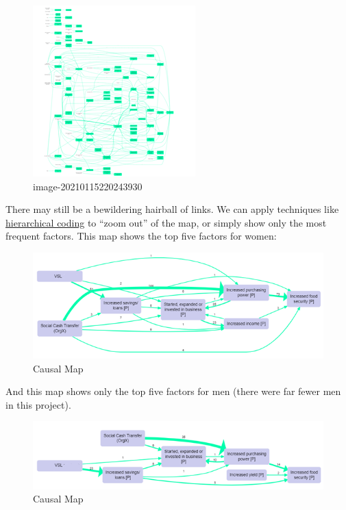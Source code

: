 \documentclass[
]{book}
\begin{document}
\begin{figure}
\centering
\includegraphics{_assets/image-20210115220243930.png}
\caption{image-20210115220243930}
\end{figure}

There may still be a bewildering hairball of links. We can apply techniques like \href{https://causalmapdocumentation.blot.im/simplifying-causal-maps-with-hierarchical-coding}{hierarchical coding} to ``zoom out'' of the map, or simply show only the most frequent factors. This map shows the top five factors for women:

\begin{figure}
\centering
\includegraphics{_assets/women.png}
\caption{Causal Map}
\end{figure}

And this map shows only the top five factors for men (there were far fewer men in this project).

\begin{figure}
\centering
\includegraphics{_assets/men.png}
\caption{Causal Map}
\end{figure}
\end{document}
